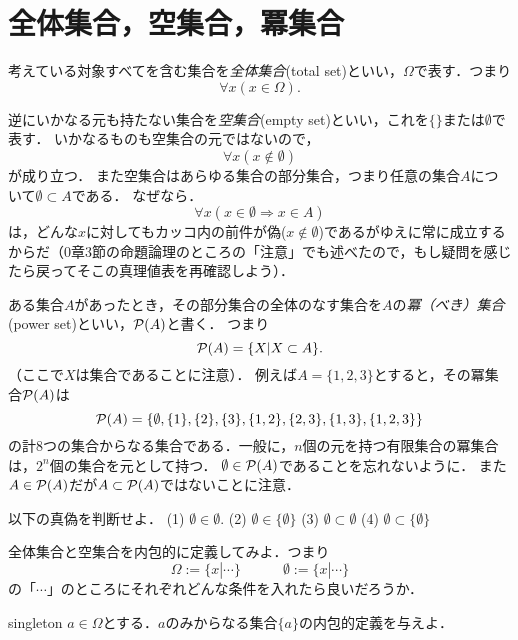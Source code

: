 \documentclass[11pt,a4paper]{jsarticle}
\begin{document}
\section{全体集合，空集合，冪集合}
考えている対象すべてを含む集合を\emph{全体集合}(total set)といい，$\Omega$で表す．つまり
\[
\forall x (x \in \Omega).
\]

逆にいかなる元も持たない集合を\emph{空集合}(empty set)といい，これを$\{\}$または$\emptyset$で表す．
いかなるものも空集合の元ではないので，
\[
\forall x (x \not\in \emptyset)
\]
が成り立つ．
また空集合はあらゆる集合の部分集合，つまり任意の集合$A$について$\emptyset \subset A$である．
なぜなら．
\[
\forall x (x \in \emptyset \Rightarrow x \in A)
\]
は，どんな$x$に対してもカッコ内の前件が偽($x \not\in \emptyset$)であるがゆえに常に成立するからだ（0章3節の命題論理のところの「注意」でも述べたので，もし疑問を感じたら戻ってそこの真理値表を再確認しよう）．

ある集合$A$があったとき，その部分集合の全体のなす集合を$A$の\emph{冪（べき）集合}(power set)といい，$\mathcal{P}(A)$と書く．
つまり
\[
 \mathcal{P}(A) = \{ X| X \subset A \}.
\]
（ここで$X$は集合であることに注意）．
例えば$A = \{1, 2, 3\}$とすると，その冪集合$\mathcal{P}(A)$は
\[
 \mathcal{P}(A) = \{ \emptyset, \{1\}, \{2\}, \{3\}, \{1,2\}, \{2,3\}, \{1,3\}, \{1,2,3\} \}
\]
の計8つの集合からなる集合である．一般に，$n$個の元を持つ有限集合の冪集合は，$2^n$個の集合を元として持つ．
$\emptyset \in \mathcal{P}(A)$であることを忘れないように．
また$A \in \mathcal{P}(A)$だが$A \subset \mathcal{P}(A)$ではないことに注意．



\begin{renshu}{}{}
以下の真偽を判断せよ．
(1) $\emptyset \in \emptyset$. %
(2) $\emptyset \in \{ \emptyset \}$ %
(3) $\emptyset \subset \emptyset$ %
(4) $\emptyset \subset \{ \emptyset \}$ %
\end{renshu}{}{}


\begin{renshu}{}{}
全体集合と空集合を内包的に定義してみよ．つまり
\[
\Omega := \{ x | \cdots \}  \hspace{3em} \emptyset := \{ x | \cdots \}
\]
の「$\cdots$」のところにそれぞれどんな条件を入れたら良いだろうか． 
\end{renshu}{}{}

\begin{renshu}{}{singleton}
$a \in \Omega$とする．$a$のみからなる集合$\{a\}$の内包的定義を与えよ． 
\end{renshu}{}{}
\end{document}
